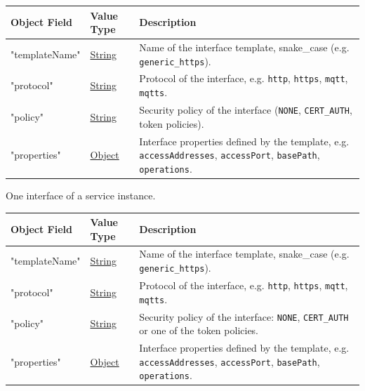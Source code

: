 \documentclass[a4paper]{arrowhead}
\newcommand{\pref}[1]{{\textcolor{ArrowheadGrey}{\hyperref[sec:model:primitives:#1]{#1}}}}
\begin{document}
\noindent\begin{tabularx}{\textwidth}{| >{\raggedright\arraybackslash}p{3.9cm} | >{\raggedright\arraybackslash\small}p{5.3cm} | X |} \hline
\rowcolor{gray!33} Object Field & Value Type & Description \\ \hline
"template\allowbreak{}Name" & \pref{String} & Name of the interface template, snake\_case (e.g. \texttt{generic\_\allowbreak{}https}). \\ \hline
"protocol" & \pref{String} & Protocol of the interface, e.g. \texttt{http}, \texttt{https}, \texttt{mqtt}, \texttt{mqtts}. \\ \hline
"policy" & \pref{String} & Security policy of the interface (\texttt{NONE}, \texttt{CERT\_\allowbreak{}AUTH}, token policies). \\ \hline
"properties" & \pref{Object} & Interface properties defined by the template, e.g. \texttt{accessAddresses}, \texttt{accessPort}, \texttt{basePath}, \texttt{operations}. \\ \hline
\end{tabularx}




One interface of a service instance.


\noindent\begin{tabularx}{\textwidth}{| >{\raggedright\arraybackslash}p{3.9cm} | >{\raggedright\arraybackslash\small}p{5.3cm} | X |} \hline
\rowcolor{gray!33} Object Field & Value Type & Description \\ \hline
"template\allowbreak{}Name" & \pref{String} & Name of the interface template, snake\_case (e.g. \texttt{generic\_\allowbreak{}https}). \\ \hline
"protocol" & \pref{String} & Protocol of the interface, e.g. \texttt{http}, \texttt{https}, \texttt{mqtt}, \texttt{mqtts}. \\ \hline
"policy" & \pref{String} & Security policy of the interface: \texttt{NONE}, \texttt{CERT\_\allowbreak{}AUTH} or one of the token policies. \\ \hline
"properties" & \pref{Object} & Interface properties defined by the template, e.g. \texttt{accessAddresses}, \texttt{accessPort}, \texttt{basePath}, \texttt{operations}. \\ \hline
\end{tabularx}



\end{document}
